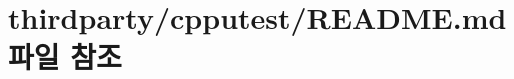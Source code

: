 \hypertarget{thirdparty_2cpputest_2_r_e_a_d_m_e_8md}{}\section{thirdparty/cpputest/\+R\+E\+A\+D\+ME.md 파일 참조}
\label{thirdparty_2cpputest_2_r_e_a_d_m_e_8md}
